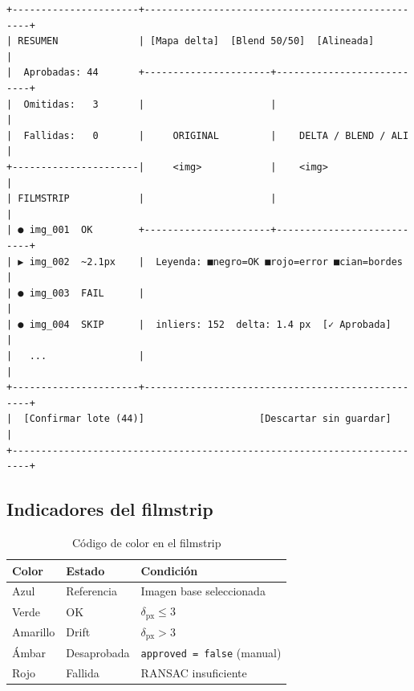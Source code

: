 \begin{codebox}
\begin{verbatim}
+----------------------+--------------------------------------------------+
| RESUMEN              | [Mapa delta]  [Blend 50/50]  [Alineada]          |
|  Aprobadas: 44       +----------------------+---------------------------+
|  Omitidas:   3       |                      |                           |
|  Fallidas:   0       |     ORIGINAL         |    DELTA / BLEND / ALI    |
+----------------------|     <img>            |    <img>                  |
| FILMSTRIP            |                      |                           |
| ● img_001  OK        +----------------------+---------------------------+
| ▶ img_002  ~2.1px    |  Leyenda: ■negro=OK ■rojo=error ■cian=bordes    |
| ● img_003  FAIL      |                                                   |
| ● img_004  SKIP      |  inliers: 152  delta: 1.4 px  [✓ Aprobada]      |
|   ...                |                                                   |
+----------------------+--------------------------------------------------+
|  [Confirmar lote (44)]                    [Descartar sin guardar]        |
+-------------------------------------------------------------------------+
\end{verbatim}
\end{codebox}

\subsection{Indicadores del filmstrip}

\begin{table}[H]
\centering
\caption{Código de color en el filmstrip}
\begin{tabular}{C{2.5cm} L{4cm} L{6cm}}
\toprule
\textbf{Color} & \textbf{Estado} & \textbf{Condición} \\
\midrule
{} Azul   & Referencia  & Imagen base seleccionada \\
 Verde & OK          & $\delta_\text{px} \leq 3$ \\
 Amarillo & Drift     & $\delta_\text{px} > 3$ \\
 Ámbar   & Desaprobada & \texttt{approved = false} (manual) \\
 Rojo   & Fallida     & RANSAC insuficiente \\
\bottomrule
\end{tabular}
\end{table}

